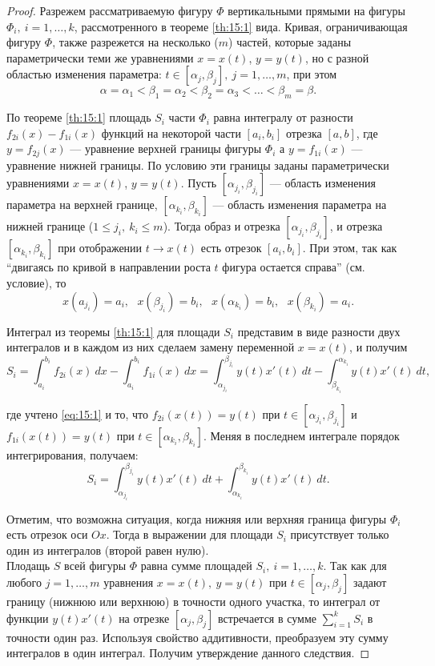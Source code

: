 \documentclass[12pt]{report}
\numberwithin{equation}{section}
\begin{document}
\begin{proof}
Разрежем рассматриваемую фигуру $\Phi$ вертикальными прямыми на фигуры $\Phi_i,~i = 1,\ldots, k$, рассмотренного в теореме \ref{th:15:1} вида. Кривая, ограничивающая фигуру $\Phi$, также разрежется на несколько ($m$) частей, которые заданы параметрически теми же уравнениями $x = x(t)$, $y = y(t)$, но с разной областью изменения параметра: $t \in [\alpha_j, \beta_j],~j = 1,\ldots, m$, при этом
\[\alpha = \alpha_1 < \beta_1 = \alpha_2 < \beta_2 = \alpha_3  < \ldots < \beta_m = \beta. \]

По теореме \ref{th:15:1} площадь $S_i$ части $\Phi_i$ равна интегралу от разности $f_{2i}(x) - f_{1i}(x)$ функций на некоторой части $[a_i, b_i]$ отрезка $[a, b]$, где $y = f_{2j}(x)$ --- уравнение верхней границы фигуры $\Phi_i$ а $y = f_{1i}(x)$ --- уравнение нижней границы. По условию эти границы заданы параметрически уравнениями $x = x(t)$, $y = y(t)$. Пусть $[\alpha_{j_i}, \beta_{j_i}]$ --- область изменения параметра на верхней границе, $[\alpha_{k_i}, \beta_{k_i}]$ --- область изменения параметра на нижней границе ($1 \leqslant j_i,~k_i \leqslant m$). Тогда образ и отрезка $[\alpha_{j_i}, \beta_{j_i}]$, и отрезка $[\alpha_{k_i}, \beta_{k_i}]$ при отображении $t \to x(t)$ есть отрезок $[a_i, b_i]$. При этом, так как ``двигаясь по кривой в направлении роста $t$ фигура остается справа'' (см. условие), то
\begin{equation} \label{eq:15:1}
x(a_{j_i}) = a_i,~~~x(\beta_{j_i}) = b_i,~~~x(\alpha_{k_i}) = b_i,~~~x(\beta_{k_i}) = a_i.
\end{equation}

Интеграл из теоремы \ref{th:15:1} для площади $S_i$ представим в виде разности двух интегралов и в каждом из них сделаем замену переменной $x = x(t)$, и получим
\[ S_i = \int_{a_i}^{b_i} f_{2i} (x) ~dx - \int_{a_i}^{b_i} f_{1i}(x)~dx = \int_{\alpha_{j_i}}^{\beta_{j_i}} y(t) x'(t)~dt - \int_{\beta_{k_i}}^{\alpha_{k_i}} y(t) x'(t)~dt,\]

где учтено \eqref{eq:15:1} и то, что $f_{2i} (x(t)) = y(t)$ при $t \in [\alpha_{j_i}, \beta_{j_i}]$ и $f_{1i}(x(t)) = y(t)$ при $t \in [\alpha_{k_i}, \beta_{k_i}]$. Меняя в последнем интеграле порядок интегрирования, получаем:
\[ S_i = \int_{\alpha_{j_i}}^{\beta_{j_i}} y(t) x'(t)~dt + \int_{\alpha_{k_i}}^{\beta_{k_i}} y(t) x'(t)~dt.\]

Отметим, что возможна ситуация, когда нижняя или верхняя граница фигуры $\Phi_i$ есть отрезок оси $Ox$. Тогда в выражении для площади $S_i$ присутствует только один из интегралов (второй равен нулю).\\

Плодащь $S$ всей фигуры $\Phi$ равна сумме площадей $S_i,~i = 1,\ldots,k$. Так как для любого $j = 1,\ldots,m$ уравнения $x= x(t),~y = y(t)$ при $t \in [\alpha_j, \beta_j]$ задают границу (нижнюю или верхнюю) в точности одного участка, то интеграл от функции $y(t) x'(t)$ на отрезке $[\alpha_j, \beta_j]$ встречается в сумме $\sum\limits_{i=1}^k S_i$ в точности один раз. Используя свойство аддитивности, преобразуем эту сумму интегралов в один интеграл. Получим утверждение данного следствия.
\end{proof}
\end{document}
